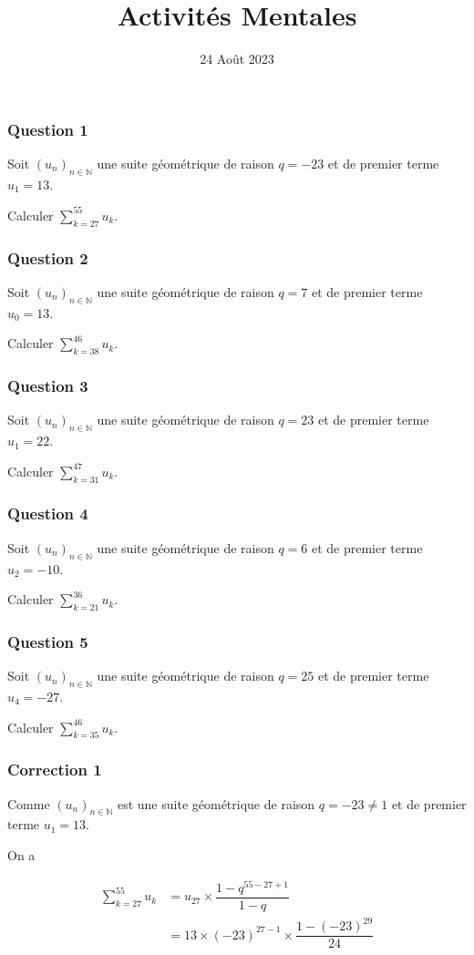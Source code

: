\documentclass[15pt, mathserif]{beamer}
\title{Activités Mentales}
\date{24 Août 2023}
\begin{document}
\begin{frame}
    \titlepage
\end{frame}

\begin{frame} 
	\frametitle{Question 1}
Soit $(u_n)_{n\in\mathbb{N}}$ une suite géométrique de raison $q = -23$ et de premier terme $u_1 = 13$.

Calculer $\displaystyle\sum_{k=27}^{55}u_k$.\end{frame}


\begin{frame} 
	\frametitle{Question 2}
Soit $(u_n)_{n\in\mathbb{N}}$ une suite géométrique de raison $q = 7$ et de premier terme $u_0 = 13$.

Calculer $\displaystyle\sum_{k=38}^{46}u_k$.\end{frame}


\begin{frame} 
	\frametitle{Question 3}
Soit $(u_n)_{n\in\mathbb{N}}$ une suite géométrique de raison $q = 23$ et de premier terme $u_1 = 22$.

Calculer $\displaystyle\sum_{k=31}^{47}u_k$.\end{frame}


\begin{frame} 
	\frametitle{Question 4}
Soit $(u_n)_{n\in\mathbb{N}}$ une suite géométrique de raison $q = 6$ et de premier terme $u_2 = -10$.

Calculer $\displaystyle\sum_{k=21}^{36}u_k$.\end{frame}


\begin{frame} 
	\frametitle{Question 5}
Soit $(u_n)_{n\in\mathbb{N}}$ une suite géométrique de raison $q = 25$ et de premier terme $u_4 = -27$.

Calculer $\displaystyle\sum_{k=35}^{46}u_k$.\end{frame}


\begin{frame}
\vspace{-10mm}
	\frametitle{Correction 1}
Comme $(u_n)_{n\in\mathbb{N}}$ est une suite géométrique de raison $q = -23 \neq 1$ et de premier terme $u_1=13$.

 On a

\begin{align*}\displaystyle\sum_{k=27}^{55} u_k &= u_{27}\times \dfrac{1-q^{55-27+1}}{1-q} \\
	&=13\times \left(-23\right)^{27-1}\times \dfrac{1-\left(-23\right)^{29}}{24}
\end{align*}\end{frame}
\end{document}
